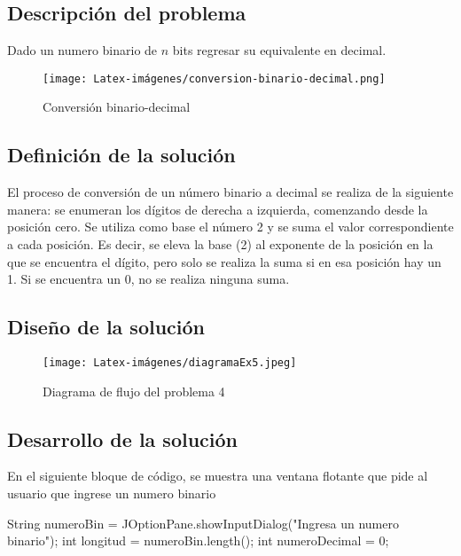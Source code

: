 

\subsection{Descripción del problema}
Dado un numero binario de $n$ bits regresar su equivalente en decimal.


\begin {figure}[h!]
\centerline{\texttt{[image: Latex-imágenes/conversion-binario-decimal.png]}}
\caption{Conversión binario-decimal}
\label{fig}
\end {figure}

\subsection{Definición de la solución}
El proceso de conversión de un número binario a decimal se realiza de la siguiente manera: se enumeran los dígitos de derecha a izquierda, comenzando desde la posición cero. Se utiliza como base el número 2 y se suma el valor correspondiente a cada posición. Es decir, se eleva la base (2) al exponente de la posición en la que se encuentra el dígito, pero solo se realiza la suma si en esa posición hay un 1. Si se encuentra un 0, no se realiza ninguna suma.

\subsection{Diseño de la solución}

\begin {figure}[h!]
\centerline{\texttt{[image: Latex-imágenes/diagramaEx5.jpeg]}}
\caption{Diagrama de flujo del problema 4}
\label{fig}
\end {figure}



\subsection{Desarrollo de la solución}

En el siguiente bloque de código, se muestra una ventana flotante que pide al usuario que ingrese un numero binario 

\begin{javaCode}
    String numeroBin = JOptionPane.showInputDialog("Ingresa un numero binario");
        int longitud = numeroBin.length();
        int numeroDecimal = 0;
\end{javaCode}

